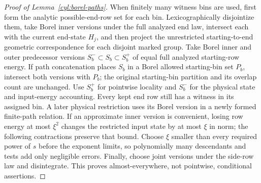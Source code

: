\begin{proof}[Proof of Lemma~\ref{cyl:borel-paths}]
When finitely many witness bins are used, first form the analytic
possible-end-row set for each bin.  Lexicographically disjointize
them, take Borel inner versions under the full analyzed end law,
intersect each with the current end-state $H_j$, and then
project the unrestricted starting-to-end geometric correspondence
for each disjoint marked group. Take Borel inner and outer
predecessor versions $S_b^-\subset S_b\subset S_b^+$ of equal full
analyzed starting-row energy. If path concatenation places $S_b$
in a Borel allowed starting-bin set $P_b$, intersect both versions
with $P_b$; the
original starting-bin partition and its overlap count are unchanged.
Use $S_b^+$ for pointwise locality and $S_b^-$ for the physical
state and input-energy accounting. Every kept end row still has a
witness in its assigned bin.  A later
physical restriction uses its Borel version in a newly formed
finite-path relation.  If an approximate inner version is convenient,
losing row energy at most $\xi^2$ changes the restricted input state
by at most $\xi$ in norm; the following contractions preserve that
bound.  Choose $\xi$ smaller than every required power of $s$ before
the exponent limits, so polynomially many descendants and tests add
only negligible errors.  Finally, choose joint versions under the
side-row law and disintegrate.  This proves almost-everywhere, not
pointwise, conditional assertions.
\end{proof}
